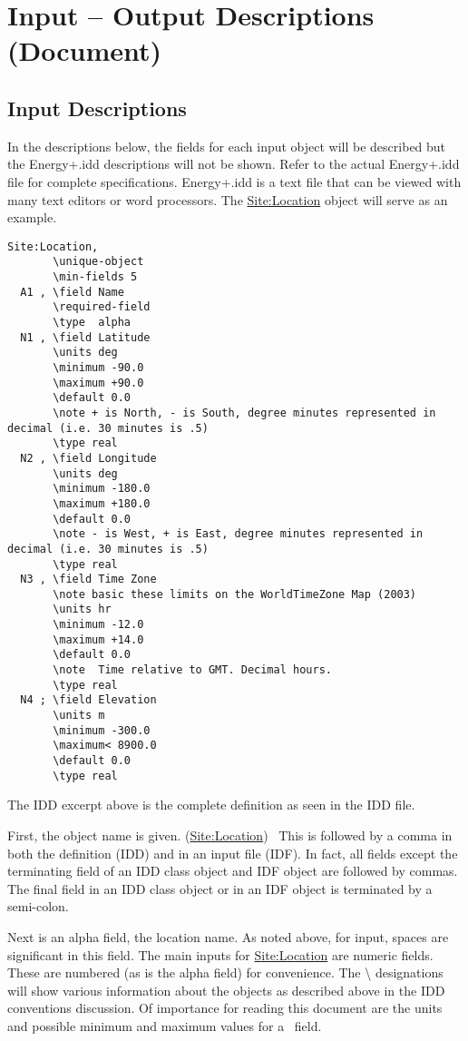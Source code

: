 \section{Input -- Output Descriptions (Document)}\label{input-output-descriptions-document}

\subsection{Input Descriptions}\label{input-descriptions}

In the descriptions below, the fields for each input object will be described but the Energy+.idd descriptions will not be shown. Refer to the actual Energy+.idd file for complete specifications. Energy+.idd is a text file that can be viewed with many text editors or word processors. The \hyperref[sitelocation]{Site:Location} object will serve as an example.

\begin{lstlisting}
Site:Location,
       \unique-object
       \min-fields 5
  A1 , \field Name
       \required-field
       \type  alpha
  N1 , \field Latitude
       \units deg
       \minimum -90.0
       \maximum +90.0
       \default 0.0
       \note + is North, - is South, degree minutes represented in decimal (i.e. 30 minutes is .5)
       \type real
  N2 , \field Longitude
       \units deg
       \minimum -180.0
       \maximum +180.0
       \default 0.0
       \note - is West, + is East, degree minutes represented in decimal (i.e. 30 minutes is .5)
       \type real
  N3 , \field Time Zone
       \note basic these limits on the WorldTimeZone Map (2003)
       \units hr
       \minimum -12.0
       \maximum +14.0
       \default 0.0
       \note  Time relative to GMT. Decimal hours.
       \type real
  N4 ; \field Elevation
       \units m
       \minimum -300.0
       \maximum< 8900.0
       \default 0.0
       \type real
\end{lstlisting}

The IDD excerpt above is the complete definition as seen in the IDD file.

First, the object name is given. (\hyperref[sitelocation]{Site:Location})~ This is followed by a comma in both the definition (IDD) and in an input file (IDF). In fact, all fields except the terminating field of an IDD class object and IDF object are followed by commas. The final field in an IDD class object or in an IDF object is terminated by a semi-colon.

Next is an alpha field, the location name. As noted above, for input, spaces are significant in this field. The main inputs for \hyperref[sitelocation]{Site:Location} are numeric fields. These are numbered (as is the alpha field) for convenience. The \textbackslash{} designations will show various information about the objects as described above in the IDD conventions discussion. Of importance for reading this document are the units and possible minimum and maximum values for a~ field.

